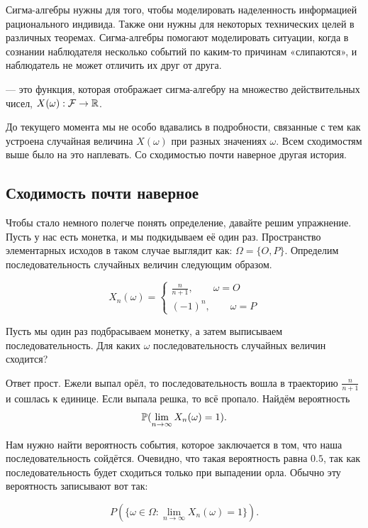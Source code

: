 \documentclass[12pt, a4paper, oneside]{article}
\begin{document}
Сигма-алгебры нужны для того, чтобы моделировать наделенность информацией рационального индивида. Также они нужны для некоторых технических целей в различных теоремах. Сигма-алгебры помогают моделировать ситуации, когда в сознании наблюдателя несколько событий по каким-то причинам «слипаются», и наблюдатель не может отличить их друг от друга. 

\begin{definition}
 --- это функция, которая отображает сигма-алгебру на множество действительных чисел, $X(\omega) : \mathcal{F} \to \mathbb{R}$.
\end{definition} 

До текущего момента мы не особо вдавались в подробности, связанные с тем как устроена случайная величина $X(\omega)$ при разных значениях $\omega$. Всем сходимостям выше было на это наплевать. Со сходимостью почти наверное другая история. 

\subsection{Сходимость почти наверное} 

Чтобы стало немного полегче понять определение, давайте решим упражнение. Пусть у нас есть монетка, и мы подкидываем её один раз. Пространство элементарных исходов в таком случае выглядит как: $\Omega = \{O, P\}$. Определим последовательность случайных величин следующим образом.

$$
X_n(\omega) = \begin{cases} \frac{n}{n+1}, \qquad \omega = O \\ (-1)^n, \qquad \omega = P \end{cases}
$$

Пусть мы один раз подбрасываем монетку, а затем выписываем последовательность. Для каких $\omega$ последовательность случайных величин сходится? 

Ответ прост. Ежели выпал орёл, то последовательность вошла в траекторию $\frac{n}{n+1}$ и сошлась к единице. Если выпала решка, то всё пропало. Найдём вероятность $$ \mathbb{P}(\lim_{n \to \infty} X_n(\omega) = 1).$$

Нам нужно найти вероятность события, которое заключается в том, что наша последовательность сойдётся. Очевидно, что такая вероятность равна $0.5$, так как последовательность будет сходиться только при выпадении орла. Обычно эту вероятность записывают вот так: 

$$ P(\{\omega \in \Omega : \lim_{n \to \infty} X_n(\omega) = 1\}).$$
\end{document}
